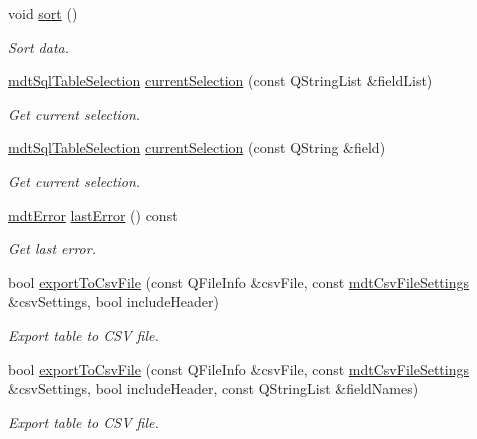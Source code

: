 \begin{DoxyCompactItemize}
void \hyperlink{classmdt_sql_table_widget_a5e1323816fce33680857048db8cbb255}{sort} ()
\begin{DoxyCompactList}\small\item\em Sort data. \end{DoxyCompactList}\item 
\hyperlink{classmdt_sql_table_selection}{mdt\-Sql\-Table\-Selection} \hyperlink{classmdt_sql_table_widget_a65f1bb0ebf82f73ef4a61e53ec4a26a7}{current\-Selection} (const Q\-String\-List \&field\-List)
\begin{DoxyCompactList}\small\item\em Get current selection. \end{DoxyCompactList}\item 
\hyperlink{classmdt_sql_table_selection}{mdt\-Sql\-Table\-Selection} \hyperlink{classmdt_sql_table_widget_adb4792d2ed64a9cce61bc429986ae9a1}{current\-Selection} (const Q\-String \&field)
\begin{DoxyCompactList}\small\item\em Get current selection. \end{DoxyCompactList}\item 
\hyperlink{classmdt_error}{mdt\-Error} \hyperlink{classmdt_sql_table_widget_a15ca772be92e80bbb964a72a8706fbeb}{last\-Error} () const 
\begin{DoxyCompactList}\small\item\em Get last error. \end{DoxyCompactList}\item 
bool \hyperlink{classmdt_sql_table_widget_af61c395fce028f13f646a1e727b2c46b}{export\-To\-Csv\-File} (const Q\-File\-Info \&csv\-File, const \hyperlink{structmdt_csv_file_settings}{mdt\-Csv\-File\-Settings} \&csv\-Settings, bool include\-Header)
\begin{DoxyCompactList}\small\item\em Export table to C\-S\-V file. \end{DoxyCompactList}\item 
bool \hyperlink{classmdt_sql_table_widget_a6a0b50ff37b2e02bd2c37dd5f070135e}{export\-To\-Csv\-File} (const Q\-File\-Info \&csv\-File, const \hyperlink{structmdt_csv_file_settings}{mdt\-Csv\-File\-Settings} \&csv\-Settings, bool include\-Header, const Q\-String\-List \&field\-Names)
\begin{DoxyCompactList}\small\item\em Export table to C\-S\-V file. \end{DoxyCompactList}\end{DoxyCompactItemize}


